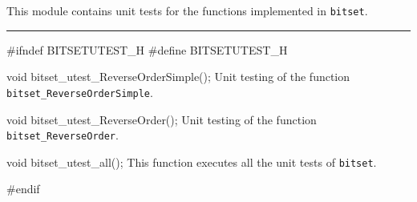 
This module contains unit tests for the functions implemented in {\tt bitset}. 

\bigskip
\hrule
\code
\hide
#ifndef BITSETUTEST_H
#define BITSETUTEST_H
\endhide
\endcode

\code
void bitset_utest_ReverseOrderSimple();
\endcode
 \tab  Unit testing of the function {\tt bitset\_ReverseOrderSimple}.
 \endtab
\code

void bitset_utest_ReverseOrder();
\endcode
 \tab  Unit testing of the function {\tt bitset\_ReverseOrder}.
 \endtab
\code

void bitset_utest_all();
\endcode
 \tab  This function executes all the unit tests of {\tt bitset}.
 \endtab
\code

\hide
#endif
\endhide
\endcode
